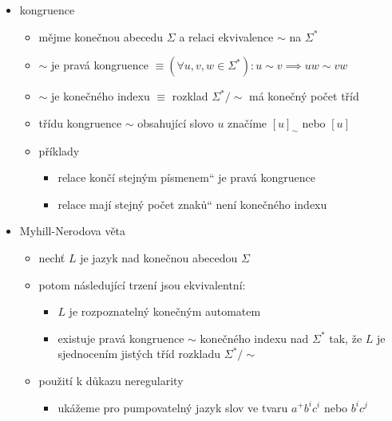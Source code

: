 \begin{itemize}
\begin{itemize}
\begin{itemize}
\item vezměme $n$ z pumping lemmatu
\item zvolme $w=0^n1^n$
\item rozdělme $w=xyz$ dle pumping lemmatu
\begin{itemize}
\item $|xy|\leq n$ je na začátku $w$, takže obsahuje jen nuly
\item $y\neq\epsilon$
\end{itemize}
\item z pumping lemmatu $xz\in L_{01}$, což je spor, protože $xz$ obsahuje méně nul než jedniček
\end{itemize}
\item kongruence
\begin{itemize}
\item mějme konečnou abecedu $\Sigma$ a relaci ekvivalence $\sim$ na $\Sigma^*$
\item $\sim$ je pravá kongruence $\equiv(\forall u,v,w\in\Sigma^*):u\sim v\implies uw\sim vw$
\item $\sim$ je konečného indexu $\equiv$ rozklad $\Sigma^*/\sim$ má konečný počet tříd
\item třídu kongruence $\sim$ obsahující slovo $u$ značíme $[u]_\sim$ nebo $[u]$
\item příklady
\begin{itemize}
\item relace \quotedblbase{}končí stejným písmenem\textquotedblleft{} je pravá kongruence
\item relace \quotedblbase{}mají stejný počet znaků\textquotedblleft{} není konečného indexu
\end{itemize}
\end{itemize}
\item Myhill-Nerodova věta
\begin{itemize}
\item nechť $L$ je jazyk nad konečnou abecedou $\Sigma$
\item potom následující trzení jsou ekvivalentní:
\begin{itemize}
\item $L$ je rozpoznatelný konečným automatem
\item existuje pravá kongruence $\sim$ konečného indexu nad $\Sigma^*$ tak, že $L$ je sjednocením jistých tříd rozkladu $\Sigma^*/\sim$
\end{itemize}
\item použití k důkazu neregularity
\begin{itemize}
\item ukážeme pro pumpovatelný jazyk slov ve tvaru $a^+b^ic^i$ nebo $b^ic^j$

\end{itemize}
\end{itemize}
\end{itemize}
\end{itemize}
